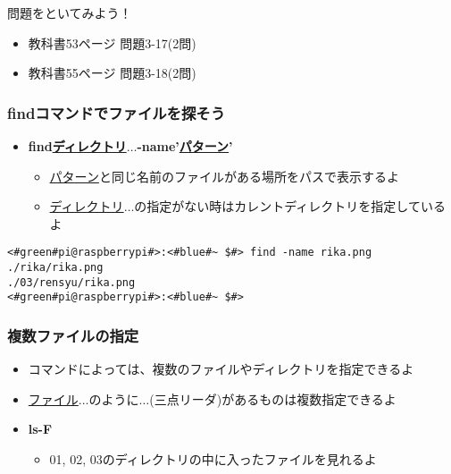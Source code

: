 \begin{frame}
    \begin{exampleblock}{問題をといてみよう！}
        \begin{itemize}
            \item 教科書53ページ 問題3-17(2問)
            \item 教科書55ページ 問題3-18(2問)
        \end{itemize}
    \end{exampleblock} 
\end{frame}

\begin{frame}[fragile]
    \frametitle{findコマンドでファイルを探そう}
    \begin{itemize}
        \item {\bf find\textvisiblespace\underline{ディレクトリ}$\ldots$\textvisiblespace -name\textvisiblespace '\underline{パターン}'}
        \begin{itemize}
            \item \underline{パターン}と同じ名前のファイルがある場所をパスで表示するよ
            \item \underline{ディレクトリ}$\ldots$の指定がない時はカレントディレクトリを指定しているよ
        \end{itemize}
    \end{itemize}
    \begin{lstlisting}[title=rika.pngをfindコマンドで探す]
<#green#pi@raspberrypi#>:<#blue#~ $#> find -name rika.png
./rika/rika.png
./03/rensyu/rika.png
<#green#pi@raspberrypi#>:<#blue#~ $#>
    \end{lstlisting}
\end{frame}

\begin{frame}
    \frametitle{複数ファイルの指定}
    \begin{itemize}
        \item コマンドによっては、複数のファイルやディレクトリを指定できるよ
        \item \underline{ファイル}$\ldots$のように$\ldots$(三点リーダ)があるものは複数指定できるよ
        \item {\bf ls\textvisiblespace -F}
        \begin{itemize}
            \item 01, 02, 03のディレクトリの中に入ったファイルを見れるよ
        \end{itemize}
    \end{itemize}
\end{frame}


